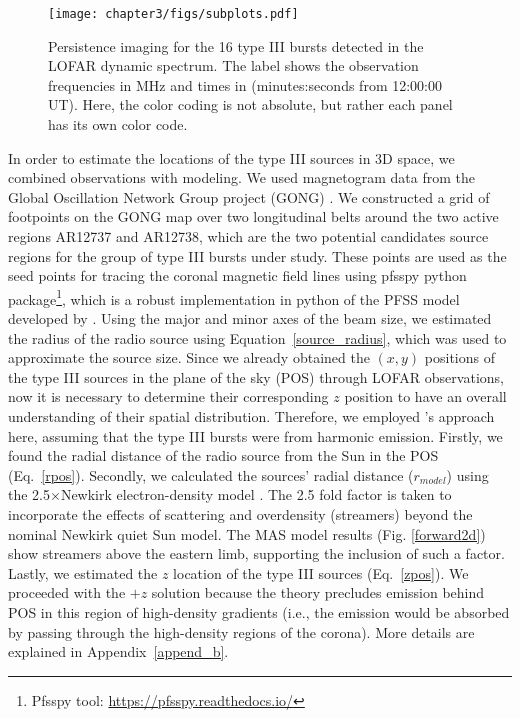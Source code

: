 \begin{figure}[ht]
\centering
\texttt{[image: chapter3/figs/subplots.pdf]}
\caption{Persistence imaging for the 16 type III bursts detected in the LOFAR dynamic spectrum. The label shows the observation frequencies in MHz and times in (minutes:seconds from 12:00:00 UT). Here, the color coding is not absolute, but rather each panel has its own color code.}
\label{fig_persistence}
\end{figure}

In order to estimate the locations of the type III sources in 3D space, we combined observations with modeling. We used magnetogram data from the Global Oscillation Network Group project (GONG) \citep{gong_1996}. We constructed a grid of footpoints on the GONG map over two longitudinal belts around the two active regions AR12737 and AR12738, which are the two potential candidates source regions for the group of type III bursts under study. These points are used as the seed points for tracing the coronal magnetic field lines using pfsspy python package\footnote{Pfsspy tool: \url{https://pfsspy.readthedocs.io/}}, which is a robust implementation in python of the PFSS model developed by \citet{pfss_2020}.
Using the major and minor axes of the beam size, we estimated the radius of the radio source using Equation~\ref{source_radius}, which was used to approximate the source size.
Since we already obtained the $(x,y)$ positions of the type III sources in the plane of the sky (POS) through LOFAR observations, now it is necessary to determine their corresponding $z$ position to have an overall understanding of their spatial distribution. Therefore, we employed \citet{badman_2022}'s approach here, assuming that the type III bursts were from harmonic emission. Firstly, we found the radial distance of the radio source from the Sun in the POS (Eq.~\ref{rpos}). Secondly, we calculated the sources' radial distance ($r_{model}$) using the 2.5$\times$Newkirk electron-density model \citep{newkirk_1961, newkirk_1967}. The 2.5 fold factor is taken to incorporate the effects of scattering and overdensity (streamers) beyond the nominal Newkirk quiet Sun model. The MAS model results (Fig. \ref{forward2d}) show streamers above the eastern limb, supporting the inclusion of such a factor.
Lastly, we estimated the $z$ location of the type III sources (Eq.~\ref{zpos}).
We proceeded with the $+z$ solution because the theory precludes emission behind POS in this region of high-density gradients (i.e., the emission would be absorbed by passing through the high-density regions of the corona). More details are explained in Appendix~\ref{append_b}.

